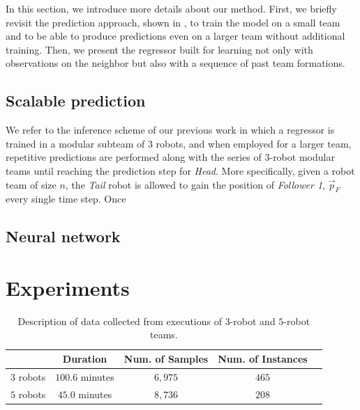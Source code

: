\documentclass[letterpaper, 10 pt, conference]{ieeeconf}  %
\begin{document}
	In this section, we introduce more details about our method. First, 
	we briefly revisit the prediction approach, shown in \cite{CPR17}, 
	to train the model on a small team and to be able to produce predictions 
	even on a larger team without additional training. 
	Then, we present the regressor built for learning not only with observations on 
	the neighbor but also with a sequence of past team formations.


	\subsection{Scalable prediction} 
	\label{sec:scalable_prediction}
	
	We refer to the inference scheme of our previous work \cite{CPR17} in which 
	a regressor is trained in a modular subteam of $3$ robots, and when employed 
	for a larger team, repetitive predictions are performed along with the series
	of $3$-robot modular teams until reaching the prediction step for \emph{Head}. 
	More specifically, given a robot team of size $n$, the \emph{Tail} robot 
	is allowed to gain the position of \emph{Follower 1}, $\vec{p}_{F}$ every 
	single time step. Once 
	
	
	\subsection{Neural network}
	\label{sec:neural_network}
	 
	
	
	\section{Experiments} 
	\label{sec:experiments} 
	
	
	\begin{table}[t]
		\label{table:data_description}
		\centering
		\begin{tabular}{|c|c|c|c|c|}
			\hline
						&  Duration & Num. of Samples & Num. of Instances  \\ \hline
			$3$ robots & $100.6$ minutes & $6,975$ & $465$  \\ \hline
			$5$ robots & $45.0$ minutes  & $8,736$ & $208$  \\ \hline
		\end{tabular}
		\caption{Description of data collected from executions of $3$-robot and $5$-robot teams.}
	\end{table}
	
\end{document}
